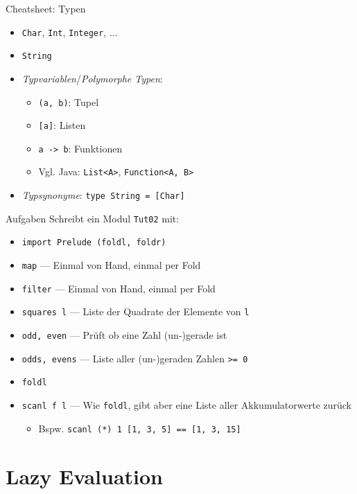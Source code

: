 \documentclass{beamer}
\begin{document}
\begin{frame}{Cheatsheet: Typen}
  \begin{itemize}
    \item \texttt{Char}, \texttt{Int}, \texttt{Integer}, ...
    \item \texttt{String}
    \item \emph{Typvariablen}/\emph{Polymorphe Typen}:
    \begin{itemize}
      \item \texttt{(a, b)}: Tupel
      \item \texttt{[a]}: Listen
      \item \texttt{a -> b}: Funktionen
      \item Vgl. Java: \texttt{List<A>}, \texttt{Function<A, B>}
    \end{itemize}
    \item \emph{Typsynonyme}: \texttt{type String = [Char]}
  \end{itemize}
\end{frame}

\begin{frame}{Aufgaben}
	Schreibt ein Modul \texttt{Tut02} mit:

	\begin{itemize}
          \item \texttt{import Prelude (foldl, foldr)}
		\item \texttt{map} --- Einmal von Hand, einmal per Fold
		\item \texttt{filter} --- Einmal von Hand, einmal per Fold
		\item \texttt{squares l} --- Liste der Quadrate der Elemente von \texttt{l}
		\item \texttt{odd, even} --- Prüft ob eine Zahl (un-)gerade ist
		\item \texttt{odds, evens} --- Liste aller (un-)geraden Zahlen \texttt{>= 0}
		\item \texttt{foldl}
		\item \texttt{scanl f l} --- Wie \texttt{foldl}, gibt aber eine Liste aller Akkumulatorwerte zurück
		\begin{itemize}
			\item Bspw. \texttt{scanl (*) 1 [1, 3, 5] == [1, 3, 15]}
		\end{itemize}
	\end{itemize}
\end{frame}

\section{Lazy Evaluation}
\end{document}
